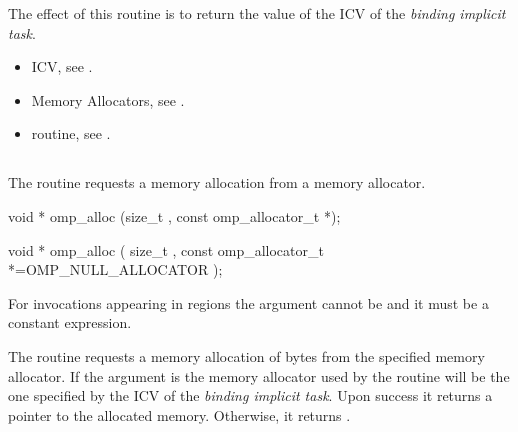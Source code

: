 The effect of this routine is to return the value of the  ICV of the \emph{binding implicit task}.

\crossreferences
\begin{itemize}
\item {} ICV, see .
\item Memory Allocators, see .
\item {} routine, see .
\end{itemize}


\newpage %
\vspace{3\baselineskip}
\begin{ccppspecific}
\vspace{-3\baselineskip}
\subsection{}
\label{subsec:omp_alloc}

\summary
The  routine requests a memory allocation from a memory allocator.

\format
\begin{cspecific}
\begin{ompcFunction}
void * omp_alloc (size_t , const omp_allocator_t *);
\end{ompcFunction}
\end{cspecific}
\begin{cppspecific}
\begin{ompcFunction}
void * omp_alloc (
  size_t ,
  const omp_allocator_t *=OMP_NULL_ALLOCATOR
);
\end{ompcFunction}
\end{cppspecific}

\constraints

For  invocations appearing in  regions the  argument cannot be  and it must be a constant expression.

\effect

The  routine requests a memory allocation of  bytes from the specified memory allocator. If the  argument is 
 the memory allocator used by the routine will be the one specified by the  ICV of the \emph{binding implicit task}.
Upon success it returns a pointer to the allocated memory. Otherwise, it returns .


\end{ccppspecific}
